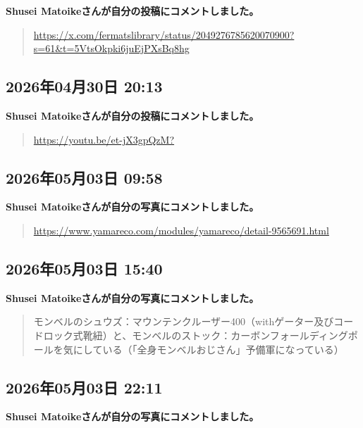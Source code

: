 \textbf{Shusei Matoikeさんが自分の投稿にコメントしました。}

\begin{quote}
\url{https://x.com/fermatslibrary/status/2049276785620070900?s=61&t=5VtsOkpki6juEjPXsBq8hg}
\end{quote}

\subsection*{2026年04月30日 20:13}

\textbf{Shusei Matoikeさんが自分の投稿にコメントしました。}

\begin{quote}
\url{https://youtu.be/et-jX3gpQzM?}
\end{quote}

\subsection*{2026年05月03日 09:58}

\textbf{Shusei Matoikeさんが自分の写真にコメントしました。}

\begin{quote}
\url{https://www.yamareco.com/modules/yamareco/detail-9565691.html}
\end{quote}

\subsection*{2026年05月03日 15:40}

\textbf{Shusei Matoikeさんが自分の写真にコメントしました。}

\begin{quote}
モンベルのシュウズ：マウンテンクルーザー400（withゲーター及びコードロック式靴紐）と、モンベルのストック：カーボンフォールディングポールを気にしている（「全身モンベルおじさん」予備軍になっている）
\end{quote}

\subsection*{2026年05月03日 22:11}

\textbf{Shusei Matoikeさんが自分の写真にコメントしました。}

